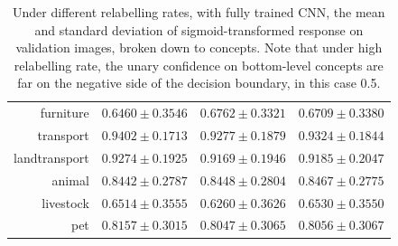 \documentclass[11pt,a4paper]{book}
\begin{document}
\begin{table}[htbp]
\begin{tabular}{r|c|c|c}
furniture     & $0.6460\pm0.3546$ & $0.6762\pm0.3321$ & $0.6709\pm0.3380$\\
transport     & $0.9402\pm0.1713$ & $0.9277\pm0.1879$ & $0.9324\pm0.1844$\\
landtransport & $0.9274\pm0.1925$ & $0.9169\pm0.1946$ & $0.9185\pm0.2047$\\
animal        & $0.8442\pm0.2787$ & $0.8448\pm0.2804$ & $0.8467\pm0.2775$\\
livestock     & $0.6514\pm0.3555$ & $0.6260\pm0.3626$ & $0.6530\pm0.3550$\\
pet           & $0.8157\pm0.3015$ & $0.8047\pm0.3065$ & $0.8056\pm0.3067$
\end{tabular}
\caption{Under different relabelling rates, with fully trained CNN, the mean and standard deviation of sigmoid-transformed response on validation images, broken down to concepts. Note that under high relabelling rate, the unary confidence on bottom-level concepts are far on the negative side of the decision boundary, in this case 0.5.}
\label{tab:cnnresp}
\end{table}
\end{document}
